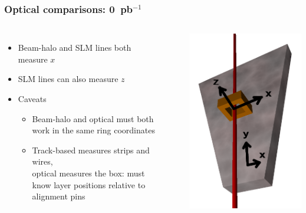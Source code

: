 \documentclass[compress]{beamer}
\begin{document}
\begin{frame}
\frametitle{Optical comparisons: 0~pb$^{-1}$}

\begin{columns}
\begin{itemize}\setlength{\itemsep}{0.2 cm}
\item Beam-halo and SLM lines both measure $x$
\item SLM lines can also measure $z$
\item Caveats
\begin{itemize}
\item Beam-halo and optical must both work in the same ring coordinates
\item Track-based measures strips and wires, \\ optical measures the box: must know layer positions relative to alignment pins
\end{itemize}
\end{itemize}
\mbox{ }
\vspace{1 cm}

\includegraphics[width=\linewidth]{comparison/comparison.png}
\end{columns}


\end{frame}
\end{document}
